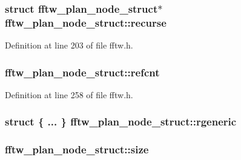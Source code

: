 \subsubsection[{\texorpdfstring{recurse}{recurse}}]{\setlength{\rightskip}{0pt plus 5cm}struct {\bf fftw\+\_\+plan\+\_\+node\+\_\+struct}$\ast$ fftw\+\_\+plan\+\_\+node\+\_\+struct\+::recurse}\hypertarget{structfftw__plan__node__struct_aa3ffc937d4b754addf7d17b18b313c70}{}\label{structfftw__plan__node__struct_aa3ffc937d4b754addf7d17b18b313c70}


Definition at line 203 of file fftw.\+h.

\subsubsection[{\texorpdfstring{refcnt}{refcnt}}]{ fftw\+\_\+plan\+\_\+node\+\_\+struct\+::refcnt}\hypertarget{structfftw__plan__node__struct_a06f58dea6a277300bfcedba74c8bc3ee}{}\label{structfftw__plan__node__struct_a06f58dea6a277300bfcedba74c8bc3ee}


Definition at line 258 of file fftw.\+h.

\subsubsection[{\texorpdfstring{rgeneric}{rgeneric}}]{\setlength{\rightskip}{0pt plus 5cm}struct \{ ... \}   fftw\+\_\+plan\+\_\+node\+\_\+struct\+::rgeneric}\hypertarget{structfftw__plan__node__struct_a737b1685529202cdd4b32f8c4f6c83ce}{}\label{structfftw__plan__node__struct_a737b1685529202cdd4b32f8c4f6c83ce}
\subsubsection[{\texorpdfstring{size}{size}}]{ fftw\+\_\+plan\+\_\+node\+\_\+struct\+::size}\hypertarget{structfftw__plan__node__struct_a334e1fcc2c98575d85d9a951b9e95941}{}\label{structfftw__plan__node__struct_a334e1fcc2c98575d85d9a951b9e95941}


